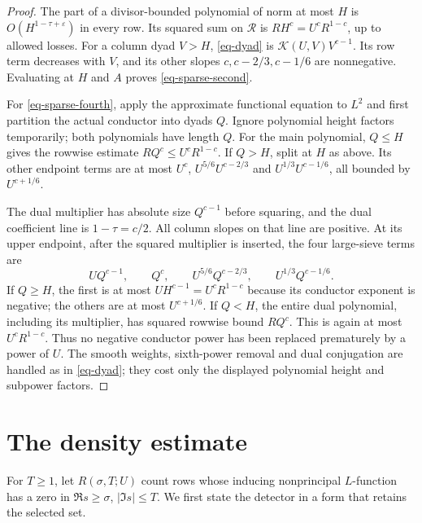 \documentclass[11pt,a4paper]{article}
\numberwithin{equation}{section}
\theoremstyle{remark}
\newcommand{\eps}{\varepsilon}
\newcommand{\K}{\mathcal K}
\newcommand{\R}{\mathcal R}
\begin{document}
\begin{proof}
The part of a divisor-bounded polynomial of norm at most $H$
is $O(H^{1-\tau+\eps})$ in every row.  Its squared sum on
$\R$ is $RH^c=U^cR^{1-c}$, up to allowed losses.
For a column dyad $V>H$, \eqref{eq-dyad} is
$\K(U,V)V^{c-1}$.  Its row term decreases with $V$, and its
other slopes $c,c-2/3,c-1/6$ are nonnegative.  Evaluating at
$H$ and $A$ proves \eqref{eq-sparse-second}.

For \eqref{eq-sparse-fourth}, apply the approximate functional
equation to $L^2$ and first partition the actual conductor into
dyads $Q$.  Ignore polynomial height factors temporarily; both
polynomials have length $Q$.  For the main polynomial, $Q\le H$
gives the rowwise estimate $RQ^c\le U^cR^{1-c}$.  If $Q>H$,
split at $H$ as above.  Its other endpoint terms are at most
$U^c$, $U^{5/6}U^{c-2/3}$ and $U^{1/3}U^{c-1/6}$,
all bounded by $U^{c+1/6}$.

The dual multiplier has absolute size $Q^{c-1}$ before squaring,
and the dual coefficient line is $1-\tau=c/2$.  All column
slopes on that line are positive.  At its upper endpoint, after
the squared multiplier is inserted, the four large-sieve terms are
\begin{equation}\label{eq-actual-conductor}
 UQ^{c-1},\qquad Q^c,\qquad
 U^{5/6}Q^{c-2/3},\qquad U^{1/3}Q^{c-1/6}.
\end{equation}
If $Q\ge H$, the first is at most $UH^{c-1}=U^cR^{1-c}$
because its conductor exponent is negative; the others are at
most $U^{c+1/6}$.  If $Q<H$, the entire dual polynomial,
including its multiplier, has squared rowwise bound $RQ^c$.
This is again at most $U^cR^{1-c}$.  Thus no negative conductor
power has been replaced prematurely by a power of $U$.
The smooth weights, sixth-power removal and dual conjugation are
handled as in \eqref{eq-dyad}; they cost only the displayed
polynomial height and subpower factors.
\end{proof}

\section{The density estimate}\label{sec-density}

For $T\ge1$, let $R(\sigma,T;U)$ count rows whose inducing nonprincipal
$L$-function has a zero in $\Re s\ge\sigma$, $|\Im s|\le T$.
We first state the detector in a form that retains the selected set.
\end{document}

